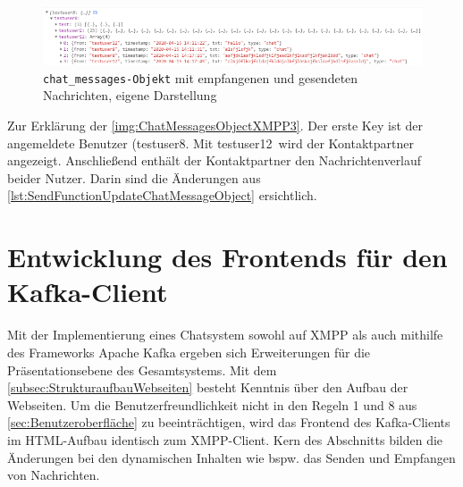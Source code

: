 \documentclass[a4paper,titlepage,halfparskip,12pt]{scrreprt}
\begin{document}
\begin{onehalfspacing}
\begin{figure}[h]
	\centering
	\includegraphics[width=\textwidth]{images/ChatMessagesObjectXMPP3}
	\caption{\texttt{chat\_messages-Objekt} mit empfangenen und gesendeten Nachrichten, eigene Darstellung}
	\label{img:ChatMessagesObjectXMPP3}
\end{figure}
Zur Erklärung der \autoref{img:ChatMessagesObjectXMPP3}. Der erste Key ist der angemeldete Benutzer (\glqq testuser8\grqq. Mit \glqq testuser12\grqq\ wird der Kontaktpartner angezeigt. Anschließend enthält der Kontaktpartner den Nachrichtenverlauf beider Nutzer. Darin sind die Änderungen aus \autoref{lst:SendFunctionUpdateChatMessageObject} ersichtlich. 
\newpage

\chapter{Entwicklung des Frontends für den Kafka-Client}
\label{sec:FrontendKafka}
Mit der Implementierung eines Chatsystem sowohl auf XMPP als auch mithilfe des Frameworks Apache Kafka ergeben sich Erweiterungen für die Präsentationsebene des Gesamtsystems. Mit dem \autoref{subsec:StrukturaufbauWebseiten} besteht Kenntnis über den Aufbau der Webseiten. Um die Benutzerfreundlichkeit nicht in den Regeln 1 und 8 aus \autoref{sec:Benutzeroberfläche} zu beeinträchtigen, wird das Frontend des Kafka-Clients im HTML-Aufbau identisch zum XMPP-Client. Kern des Abschnitts bilden die Änderungen bei den dynamischen Inhalten wie bspw. das Senden und Empfangen von Nachrichten.


\end{onehalfspacing}
\end{document}
